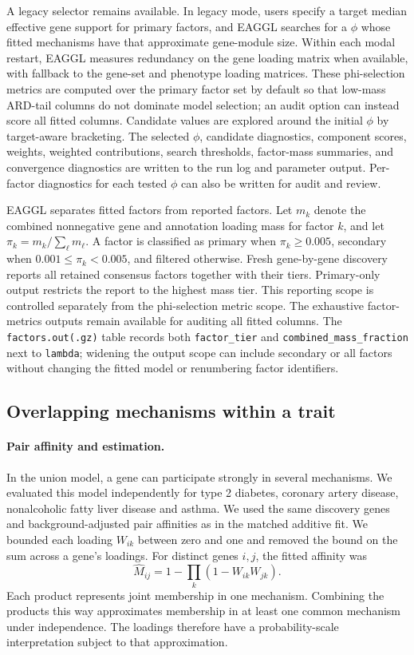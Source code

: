 \documentclass[11pt]{article}
\begin{document}
A legacy selector remains available. In legacy mode, users specify a target median effective gene support for primary factors, and EAGGL searches for a $\phi$ whose fitted mechanisms have that approximate gene-module size. Within each modal restart, EAGGL measures redundancy on the gene loading matrix when available, with fallback to the gene-set and phenotype loading matrices. These phi-selection metrics are computed over the primary factor set by default so that low-mass ARD-tail columns do not dominate model selection; an audit option can instead score all fitted columns. Candidate values are explored around the initial $\phi$ by target-aware bracketing. The selected $\phi$, candidate diagnostics, component scores, weights, weighted contributions, search thresholds, factor-mass summaries, and convergence diagnostics are written to the run log and parameter output. Per-factor diagnostics for each tested $\phi$ can also be written for audit and review.

EAGGL separates fitted factors from reported factors. Let $m_k$ denote the combined nonnegative gene and annotation loading mass for factor $k$, and let $\pi_k=m_k/\sum_{\ell}m_{\ell}$. A factor is classified as primary when $\pi_k \ge 0.005$, secondary when $0.001 \le \pi_k < 0.005$, and filtered otherwise. Fresh gene-by-gene discovery reports all retained consensus factors together with their tiers. Primary-only output restricts the report to the highest mass tier. This reporting scope is controlled separately from the phi-selection metric scope. The exhaustive factor-metrics outputs remain available for auditing all fitted columns. The \texttt{factors.out(.gz)} table records both \texttt{factor\_tier} and \texttt{combined\_mass\_fraction} next to \texttt{lambda}; widening the output scope can include secondary or all factors without changing the fitted model or renumbering factor identifiers.

\subsection{Overlapping mechanisms within a trait}
\label{sec:union_leaves}

\paragraph{Pair affinity and estimation.}
In the union model, a gene can participate strongly in several mechanisms. We evaluated this model independently for type 2 diabetes, coronary artery disease, nonalcoholic fatty liver disease and asthma. We used the same discovery genes and background-adjusted pair affinities as in the matched additive fit. We bounded each loading $W_{ik}$ between zero and one and removed the bound on the sum across a gene's loadings. For distinct genes $i,j$, the fitted affinity was
\[
  \widehat M_{ij}=1-\prod_k(1-W_{ik}W_{jk}).
\]
Each product represents joint membership in one mechanism. Combining the products this way approximates membership in at least one common mechanism under independence. The loadings therefore have a probability-scale interpretation subject to that approximation.
\end{document}
